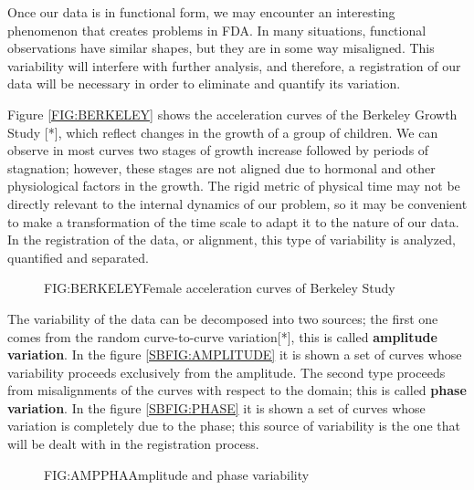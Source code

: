Once our data is in functional form, we may encounter an interesting phenomenon
that creates problems in FDA. In many situations, functional observations have
similar shapes, but they are in some way misaligned. This variability will
interfere with further analysis, and therefore, a registration of our data will
be necessary in order to eliminate and quantify its variation.

Figure \ref{FIG:BERKELEY} shows the acceleration curves of the Berkeley Growth
Study [*], which reflect changes in the growth of a group of children. We can
observe in most curves two stages of growth increase followed by periods of
stagnation; however, these stages are not aligned due to hormonal and other
physiological factors in the growth. The rigid metric of physical time may not
be directly relevant to the internal dynamics of our problem, so it may be
convenient to make a transformation of the time scale to adapt it to the nature
of our data. In the registration of the data, or alignment, this type of
variability is analyzed, quantified and separated.

\begin{figure}[Female acceleration curves of Berkeley Study]{FIG:BERKELEY}{Female acceleration curves of Berkeley Study}
\end{figure}

The variability of the data can be decomposed into two sources; the first one
comes from the random curve-to-curve variation[*], this is called
\textbf{amplitude variation}. In the figure \ref{SBFIG:AMPLITUDE} it is shown a
set of curves whose variability proceeds exclusively from the amplitude. The
second type proceeds from misalignments of the curves with respect to the
domain; this is called \textbf{phase variation}. In the figure
\ref{SBFIG:PHASE} it is shown a set of curves whose variation is completely due
to the phase; this source of variability is the one that will be dealt with in
the registration process.

\begin{figure}[Amplitude and phase variability]{FIG:AMPPHA}{Amplitude and phase variability}
   \quad
\end{figure}

